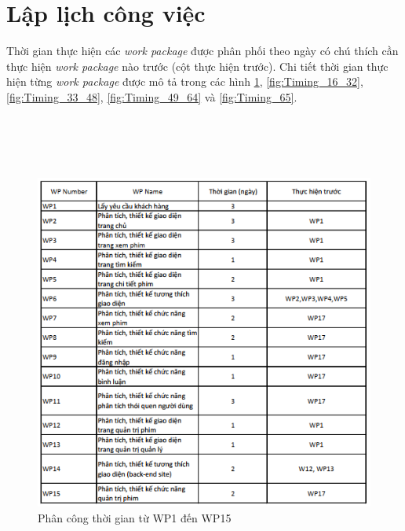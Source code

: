 \documentclass[a4paper]{book}
\begin{document}
\section{Lập lịch công việc}
Thời gian thực hiện các \textit{work package} được phân phối theo ngày có chú thích cần thực hiện \textit{work package} nào trước (cột thực hiện trước). Chi tiết thời gian thực hiện từng \textit{work package} được mô tả trong các hình \ref{fig:Timing_1_15}, \ref{fig:Timing_16_32}, \ref{fig:Timing_33_48}, \ref{fig:Timing_49_64} và \ref{fig:Timing_65}. \\ \\ \\ \\ \\ 
\begin{figure}
	\centering
	\includegraphics[width=0.7\textheight]{Timing_1_15.png}
	\caption{Phân công thời gian từ WP1 đến WP15}
	\label{fig:Timing_1_15}
\end{figure}
\end{document}
